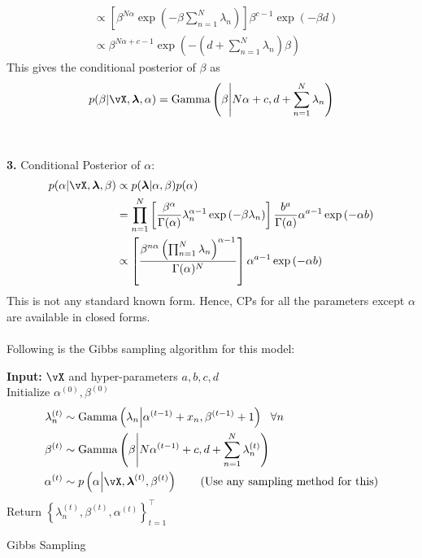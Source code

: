 \documentclass[a4paper,11pt]{article}
\begin{document}
\begin{pmisolution}
\begin{align*}
    &\propto \left[ \beta^{N \alpha} \exp{(-\beta \sum_{n=1}^N \lambda_n)} \right] \beta^{c-1} \exp{(-\beta d)}\\
    &\propto \beta^{N \alpha + c - 1} \exp{\left(- \left(d + \sum_{n=1}^N \lambda_n\right)\beta\right)}
\end{align*}
This gives the conditional posterior of $\beta$ as
\begin{equation*}
p(\beta | \vX, \boldsymbol{\lambda}, \alpha) = \text{Gamma}\left(\beta \middle| N\alpha + c, d + \sum_{n=1}^N \lambda_n\right)
\end{equation*}
\\ \\
\noindent \textbf{3. } Conditional Posterior of $\alpha$:
\begin{align*}
    p(\alpha| \vX , \boldsymbol{\lambda}, \beta) &\propto p(\boldsymbol{\lambda} | \alpha, \beta) p(\alpha)\\
    &= \prod_{n=1}^N \left[ \frac{\beta^{\alpha}}{\Gamma(\alpha)} \lambda_n^{\alpha-1} \exp{(-\beta \lambda_n)} \right] 
    \frac{b^{a}}{\Gamma(a)} \alpha^{a-1} \exp{(-\alpha b)}\\
    &\propto \left[\frac{\beta^{n \alpha} \left(\prod_{n=1}^N \lambda_n \right)^{\alpha-1}}{\Gamma(\alpha)^N} \right] \alpha^{a-1} \exp{(-\alpha b)}
\end{align*}
This is not any standard known form. Hence, CPs for all the parameters except $\alpha$ are available in closed forms.
\\ \\
\noindent Following is the Gibbs sampling algorithm for this model:\\
\begin{algorithm}[H]
\SetAlgoLined
\textbf{Input:} $\vX$ and hyper-parameters $a,b,c,d$\\
 Initialize $\alpha^{(0)}, \beta^{(0)}$ \\
  {
\begin{align}
    \lambda_n^{(t)} &\sim \text{Gamma}\left(\lambda_n \middle|\alpha^{(t-1)} + x_n, \beta^{(t-1)} + 1\right) ~~ \forall n \nonumber
    \\ \beta^{(t)} &\sim \text{Gamma}\left(\beta \middle|N\alpha^{(t-1)} +c , d+ \sum_{n=1}^N\lambda_n^{(t)}\right)
    \nonumber
    \\ \alpha^{(t)} &\sim p\left(\alpha \middle| \vX , \boldsymbol{\lambda}^{(t)}, \beta^{(t)}\right) \tag{Use any sampling method for this}
\end{align}
 }
 Return $\left\{\lambda_n^{(t)}, \beta^{(t)}, \alpha^{(t)} \right\}_{t=1}^\top$
 \caption{Gibbs Sampling}
\end{algorithm}
\end{pmisolution}
\end{document}
